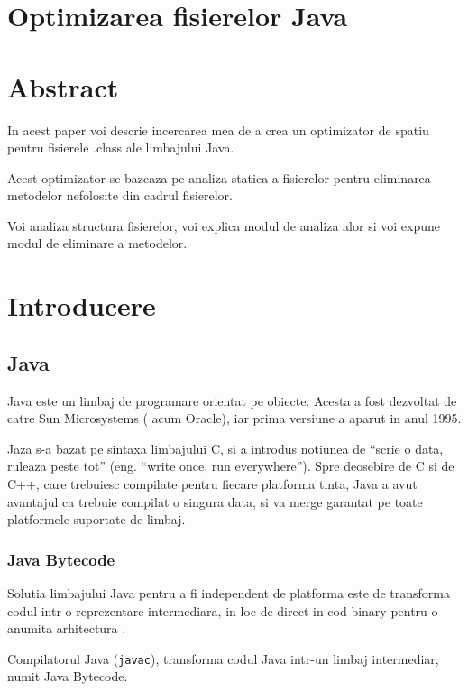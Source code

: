 \documentclass[]{article}
\date{}
\begin{document}
\section{Optimizarea fisierelor Java}\label{optimizarea-fisierelor-java}

\section{Abstract}\label{abstract}

In acest paper voi descrie incercarea mea de a crea un optimizator de
spatiu pentru fisierele .class ale limbajului Java.

Acest optimizator se bazeaza pe analiza statica a fisierelor pentru
eliminarea metodelor nefolosite din cadrul fisierelor.

Voi analiza structura fisierelor, voi explica modul de analiza alor si
voi expune modul de eliminare a metodelor.

\section{Introducere}\label{introducere}

\subsection{Java}\label{java}

Java este un limbaj de programare orientat pe obiecte. Acesta a fost
dezvoltat de catre Sun Microsystems ( acum Oracle), iar prima versiune a
aparut in anul 1995.

Jaza s-a bazat pe sintaxa limbajului C, si a introdus notiunea de
``scrie o data, ruleaza peste tot'' (eng. ``write once, run
everywhere''). Spre deosebire de C si de C++, care trebuiesc compilate
pentru fiecare platforma tinta, Java a avut avantajul ca trebuie
compilat o singura data, si va merge garantat pe toate platformele
suportate de limbaj.

\subsubsection{Java Bytecode}\label{java-bytecode}

Solutia limbajului Java pentru a fi independent de platforma este de
transforma codul intr-o reprezentare intermediara, in loc de direct in
cod binary pentru o anumita arhitectura .

Compilatorul Java (\texttt{javac}), transforma codul Java intr-un limbaj
intermediar, numit Java Bytecode.
\end{document}

